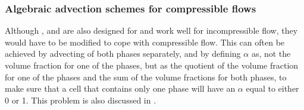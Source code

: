 \subsubsection{Algebraic advection schemes for compressible flows}

Although \CICSAM, \STACS and \MULES are also designed for and work well for incompressible flow, they would have to be modified to cope with compressible flow. This can often be achieved by advecting  of both phases separately, and by defining $\alpha$ as, not the volume fraction for one of the phases, but as the quotient of the volume fraction for one of the phases and the sum of the volume fractions for both phases, to make sure that a cell that contains only one phase will have an $\alpha$ equal to either 0 or 1. This problem is also discussed in \citep{Heyns2011}.








